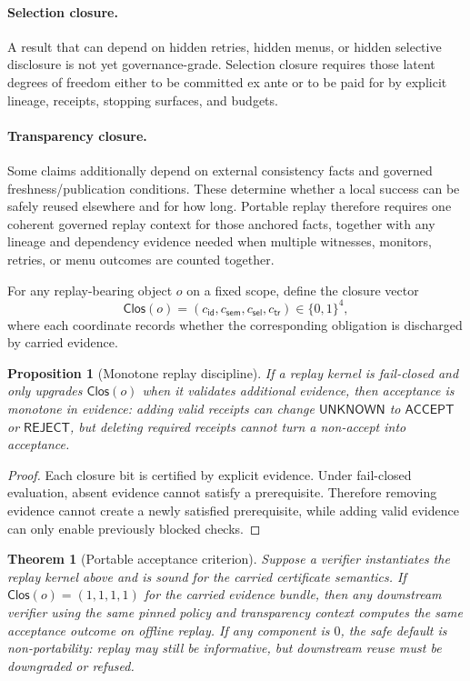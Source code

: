 \documentclass[11pt]{article}
\newtheorem{theorem}{Theorem}
\newtheorem{proposition}{Proposition}
\theoremstyle{remark}
\newcommand{\Acc}{\mathsf{ACCEPT}}
\newcommand{\Rej}{\mathsf{REJECT}}
\newcommand{\Unk}{\mathsf{UNKNOWN}}
\newcommand{\Clos}{\mathsf{Clos}}
\begin{document}
\paragraph{Selection closure.}
A result that can depend on hidden retries, hidden menus, or hidden selective disclosure is not yet governance-grade.
Selection closure requires those latent degrees of freedom either to be committed ex ante or to be paid for by explicit lineage, receipts, stopping surfaces, and budgets.

\paragraph{Transparency closure.}
Some claims additionally depend on external consistency facts and governed freshness/publication conditions.
These determine whether a local success can be safely reused elsewhere and for how long.
Portable replay therefore requires one coherent governed replay context for those anchored facts, together with any lineage and dependency evidence needed when multiple witnesses, monitors, retries, or menu outcomes are counted together.

For any replay-bearing object $o$ on a fixed scope, define the closure vector
\[
\Clos(o)=(c_{\mathsf{id}},c_{\mathsf{sem}},c_{\mathsf{sel}},c_{\mathsf{tr}})\in\{0,1\}^4,
\]
where each coordinate records whether the corresponding obligation is discharged by carried evidence.

\begin{proposition}[Monotone replay discipline]
If a replay kernel is fail-closed and only upgrades $\Clos(o)$ when it validates additional evidence, then acceptance is monotone in evidence:
adding valid receipts can change $\Unk$ to $\Acc$ or $\Rej$, but deleting required receipts cannot turn a non-accept into acceptance.
\end{proposition}

\begin{proof}
Each closure bit is certified by explicit evidence. Under fail-closed evaluation, absent evidence cannot satisfy a prerequisite.
Therefore removing evidence cannot create a newly satisfied prerequisite, while adding valid evidence can only enable previously blocked checks.
\end{proof}

\begin{theorem}[Portable acceptance criterion]
Suppose a verifier instantiates the replay kernel above and is sound for the carried certificate semantics.
If $\Clos(o)=(1,1,1,1)$ for the carried evidence bundle, then any downstream verifier using the same pinned policy and transparency context
computes the same acceptance outcome on offline replay.
If any component is $0$, the safe default is non-portability: replay may still be informative, but downstream reuse must be downgraded or refused.
\end{theorem}
\end{document}
